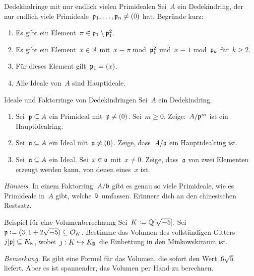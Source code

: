 \documentclass{uebblatt}
\begin{document}

\begin{aufgabe}{Dedekindringe mit nur endlich vielen Primidealen}
Sei~$A$ ein Dedekindring, der nur endlich viele
Primideale~$\mathfrak{p}_1,\ldots,\mathfrak{p}_n \neq (0)$ hat. Begründe kurz:
\begin{enumerate}
\item Es gibt ein Element~$\pi \in \mathfrak{p}_1 \setminus \mathfrak{p}_1^2$.
\item Es gibt ein Element~$x \in A$ mit~$x \equiv \pi$
mod~$\mathfrak{p}_1^2$ und~$x \equiv 1$ mod~$\mathfrak{p}_k$ für~$k \geq 2$.
\item Für dieses Element gilt~$\mathfrak{p}_1 = (x)$.
\item Alle Ideale von~$A$ sind Hauptideale.
\end{enumerate}
\end{aufgabe}

\begin{aufgabe}{Ideale und Faktorringe von Dedekindringen}
Sei~$A$ ein Dedekindring.
\begin{enumerate}
\item Sei~$\mathfrak{p} \subseteq A$ ein Primideal mit~$\mathfrak{p} \neq (0)$. Sei~$m \geq 0$.
Zeige:~$A/\mathfrak{p}^m$ ist ein Hauptidealring.
\item Sei~$\mathfrak{a} \subseteq A$ ein Ideal mit~$\mathfrak{a} \neq (0)$. Zeige, dass~$A/\mathfrak{a}$ ein
Hauptidealring ist.
\item Sei~$\mathfrak{a} \subseteq A$ ein Ideal. Sei~$x \in \mathfrak{a}$ mit~$x \neq 0$. Zeige,
dass~$\mathfrak{a}$ von zwei Elementen erzeugt werden kann, von denen eines~$x$ ist.
\end{enumerate}
{\tiny\emph{Hinweis.} In einem Faktorring~$A/\mathfrak{b}$ gibt es genau so viele
Primideale, wie es Primideale in~$A$ gibt, welche~$\mathfrak{b}$ umfassen. Erinnere
dich an den chinesischen Restsatz.\par}
\end{aufgabe}

\begin{aufgabe}{Beispiel für eine Volumenberechnung}
Sei~$K \vcentcolon= \mathbb{Q}[\sqrt{-5}]$. Sei~$\mathfrak{p} \vcentcolon= (3, 1 + 2\sqrt{-5}) \subseteq
\mathcal{O}_K$. Bestimme das Volumen des vollständigen
Gitters~$j[\mathfrak{p}] \subseteq K_{\mathbb{R}}$, wobei~$j : K \hookrightarrow K_{\mathbb{R}}$ die
Einbettung in den Minkowskiraum ist.

{\tiny\emph{Bemerkung.} Es gibt eine Formel für das Volumen, die sofort den
Wert~$6 \sqrt{5}$ liefert. Aber es ist spannender, das Volumen per Hand zu
berechnen.\par}
\end{aufgabe}
\end{document}
